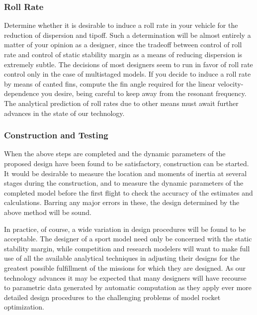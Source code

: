 \subsubsection{Roll Rate}\label{ch2:sec:6.4.4}

Determine whether it is desirable to induce a roll rate in your vehicle for
the reduction of dispersion and tipoff. Such a determination will be almost
entirely a matter of your opinion as a designer, since the tradeoff between
control of roll rate and control of static stability margin as a means of
reducing dispersion is extremely subtle. The decisions of most designers seem
to run in favor of roll rate control only in the case of multistaged models.
If you decide to induce a roll rate by means of canted fins, compute the fin
angle required for the linear velocity-dependence you desire, being careful
to keep away from the resonant frequency. The analytical prediction of roll
rates due to other means must await further advances in the state of our
technology.

\subsubsection{Construction and Testing}\label{ch2:sec:6.4.5}

When the above steps are completed and the dynamic parameters of the proposed
design have been found to be satisfactory, construction can be started. It
would be desirable to measure the \CG{} location and moments of inertia at
several stages during the construction, and to measure the dynamic parameters
of the completed model before the first flight to check the accuracy of the
estimates and calculations. Barring any major errors in these, the design
determined by the above method will be sound.

In practice, of course, a wide variation in design procedures will be found
to be acceptable. The designer of a sport model need only be concerned with
the static stability margin, while competition and research modelers will
want to make full use of all the available analytical techniques in adjusting
their designs for the greatest possible fulfillment of the missions for which
they are designed. As our technology advances it may be expected that many
designers will have recourse to parametric data generated by automatic
computation as they apply ever more detailed design procedures to the
challenging problems of model rocket optimization.
